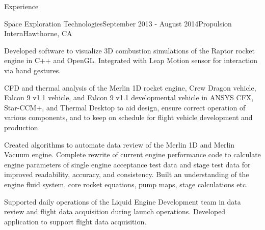 \documentclass{resume} %
\begin{document}
\begin{rSection}{Experience}
\begin{rSubsection}{Space Exploration Technologies}{September 2013 - August 2014}{Propulsion Intern}{Hawthorne, CA}
\item Developed software to visualize 3D combustion simulations of the Raptor rocket engine in C++ and OpenGL. Integrated with Leap Motion sensor for interaction via hand gestures.
\item CFD and thermal analysis of the Merlin 1D rocket engine, Crew Dragon vehicle, Falcon 9 v1.1 vehicle, and Falcon 9 v1.1 developmental vehicle in ANSYS CFX, Star-CCM+, and Thermal Desktop to aid design, ensure correct operation of various components, and to keep on schedule for flight vehicle development and production.
\item Created algorithms to automate data review of the Merlin 1D and Merlin Vacuum engine. Complete rewrite of current engine performance code to calculate engine parameters of single engine acceptance test data and stage test data for improved readability, accuracy, and consistency. Built an understanding of the engine fluid system, core rocket equations, pump maps, stage calculations etc.
\item Supported daily operations of the Liquid Engine Development team in data review and flight data acquisition during launch operations. Developed application to support flight data acquisition.
\end{rSubsection}




\end{rSection}
\end{document}
